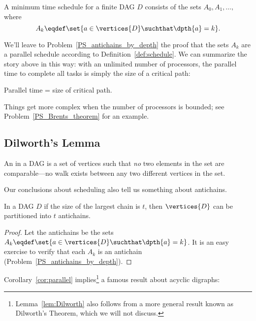 \begin{theorem}\label{thm:parallel-time}
A minimum time schedule for a finite DAG $D$ consists of the sets
$A_0, A_1,\dots,$ where
\[
A_k \eqdef \set{a \in \vertices{D} \suchthat \dpth{a} =k}.
\]
\end{theorem}

We'll leave to Problem~\ref{PS_antichains_by_depth} the proof that the
sets $A_k$ are a parallel schedule according to
Definition~\ref{def:schedule}.  We can summarize the story above in
this way: with an unlimited number of processors, the parallel time to
complete all tasks is simply the size of a critical path:
\begin{corollary}\label{cor:critical-path-time}
Parallel time = size of critical path.
\end{corollary}

Things get more complex when the number of processors is bounded; see
Problem~\ref{PS_Brents_theorem} for an example.\iffalse But the
deductions we've made by assuming unlimited processors will still lead
us to useful conclusions.\fi

\subsection{Dilworth's Lemma}\label{dilworth_subsec}

\begin{definition}
An  in a DAG is a set of vertices such that \emph{no}
two elements in the set are comparable---no walk exists between any
two different vertices in the set.
\end{definition}

Our conclusions about scheduling also tell us something about antichains.

\begin{corollary}\label{cor:parallel}
In a DAG $D$ if the size of the largest chain is $t$, then
$\vertices{D}$ can be partitioned into $t$ antichains.
\end{corollary}

\begin{proof}
Let the antichains be the sets $A_k \eqdef \set{a \in \vertices{D}
  \suchthat \dpth{a} =k}$.  It is an easy exercise to verify that each
$A_k$ is an antichain (Problem~\ref{PS_antichains_by_depth}).
\end{proof}

Corollary~\ref{cor:parallel} implies\footnote{Lemma~\ref{lem:Dilworth}
  also follows from a more general result known as Dilworth's Theorem,
  which we will not discuss.} a famous result about acyclic digraphs:

